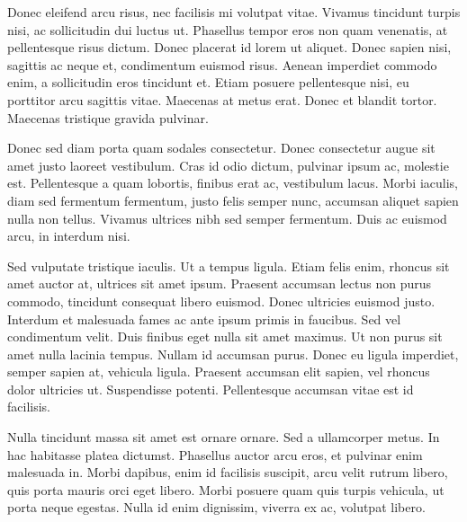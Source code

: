 Donec eleifend arcu risus, nec facilisis mi volutpat vitae. Vivamus tincidunt turpis nisi, ac sollicitudin dui luctus ut. Phasellus tempor eros non quam venenatis, at pellentesque risus dictum. Donec placerat id lorem ut aliquet. Donec sapien nisi, sagittis ac neque et, condimentum euismod risus. Aenean imperdiet commodo enim, a sollicitudin eros tincidunt et. Etiam posuere pellentesque nisi, eu porttitor arcu sagittis vitae. Maecenas at metus erat. Donec et blandit tortor. Maecenas tristique gravida pulvinar.

Donec sed diam porta quam sodales consectetur. Donec consectetur augue sit amet justo laoreet vestibulum. Cras id odio dictum, pulvinar ipsum ac, molestie est. Pellentesque a quam lobortis, finibus erat ac, vestibulum lacus. Morbi iaculis, diam sed fermentum fermentum, justo felis semper nunc, accumsan aliquet sapien nulla non tellus. Vivamus ultrices nibh sed semper fermentum. Duis ac euismod arcu, in interdum nisi.

Sed vulputate tristique iaculis. Ut a tempus ligula. Etiam felis enim, rhoncus sit amet auctor at, ultrices sit amet ipsum. Praesent accumsan lectus non purus commodo, tincidunt consequat libero euismod. Donec ultricies euismod justo. Interdum et malesuada fames ac ante ipsum primis in faucibus. Sed vel condimentum velit. Duis finibus eget nulla sit amet maximus. Ut non purus sit amet nulla lacinia tempus. Nullam id accumsan purus. Donec eu ligula imperdiet, semper sapien at, vehicula ligula. Praesent accumsan elit sapien, vel rhoncus dolor ultricies ut. Suspendisse potenti. Pellentesque accumsan vitae est id facilisis.

Nulla tincidunt massa sit amet est ornare ornare. Sed a ullamcorper metus. In hac habitasse platea dictumst. Phasellus auctor arcu eros, et pulvinar enim malesuada in. Morbi dapibus, enim id facilisis suscipit, arcu velit rutrum libero, quis porta mauris orci eget libero. Morbi posuere quam quis turpis vehicula, ut porta neque egestas. Nulla id enim dignissim, viverra ex ac, volutpat libero.


\cleardoublepage

\glsresetall



